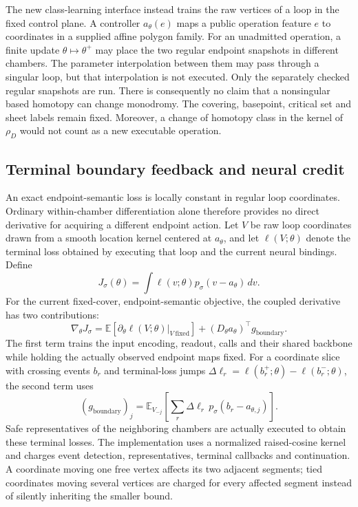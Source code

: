 The new class-learning interface instead trains the raw vertices of a loop in
the fixed control plane. A controller $a_\theta(e)$ maps a public operation
feature $e$ to coordinates in a supplied affine polygon family. For an
unadmitted operation, a finite update $\theta\mapsto\theta^+$ may place the
two regular endpoint snapshots in different chambers. The parameter
interpolation between them may pass through a singular loop, but that
interpolation is not executed. Only the separately checked regular snapshots
are run. There is consequently no claim that a nonsingular based homotopy can
change monodromy. The covering, basepoint, critical set and sheet labels remain
fixed. Moreover, a change of homotopy class in the kernel of $\rho_D$ would
not count as a new executable operation.

\subsection{Terminal boundary feedback and neural credit}

An exact endpoint-semantic loss is locally constant in regular loop
coordinates. Ordinary within-chamber differentiation alone therefore provides
no direct derivative for acquiring a different endpoint action. Let $V$ be
raw loop coordinates drawn from a smooth location kernel centered at
$a_\theta$, and let $\ell(V;\theta)$ denote the terminal loss obtained by
executing that loop and the current neural bindings. Define
\begin{equation}
 J_\sigma(\theta)
 =\int \ell(v;\theta)p_\sigma(v-a_\theta)\,dv.
 \label{eq:coupled-smoothed-objective}
\end{equation}
For the current fixed-cover, endpoint-semantic objective, the coupled
derivative has two contributions:
\begin{equation}
 \nabla_\theta J_\sigma
 =\mathbb E\!\left[\left.\partial_\theta\ell(V;\theta)
                    \right|_{V\ \mathrm{fixed}}\right]
 +(D_\theta a_\theta)^\top g_{\mathrm{boundary}}.
 \label{eq:coupled-boundary-derivative}
\end{equation}
The first term trains the input encoding, readout, calls and their shared
backbone while holding the actually observed endpoint maps fixed. For a
coordinate slice with crossing events $b_r$ and terminal-loss jumps
$\Delta\ell_r=\ell(b_r^+;\theta)-\ell(b_r^-;\theta)$, the second term uses
\begin{equation}
 (g_{\mathrm{boundary}})_j
 =\mathbb E_{V_{-j}}\!\left[
       \sum_r\Delta\ell_r\,p_\sigma(b_r-a_{\theta,j})\right].
 \label{eq:boundary-jump-estimator}
\end{equation}
Safe representatives of the neighboring chambers are actually executed to
obtain these terminal losses. The implementation uses a normalized
raised-cosine kernel and charges event detection, representatives, terminal
callbacks and continuation. A coordinate moving one free vertex affects its
two adjacent segments; tied coordinates moving several vertices are charged
for every affected segment instead of silently inheriting the smaller bound.

